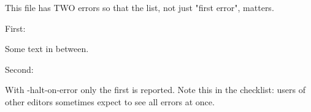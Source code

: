 \documentclass{article}
\begin{document}
This file has TWO errors so that the list, not just "first error", matters.

First: \undefinedA

Some text in between.

Second: \undefinedB

With -halt-on-error only the first is reported. Note this in the checklist:
users of other editors sometimes expect to see all errors at once.
\end{document}

